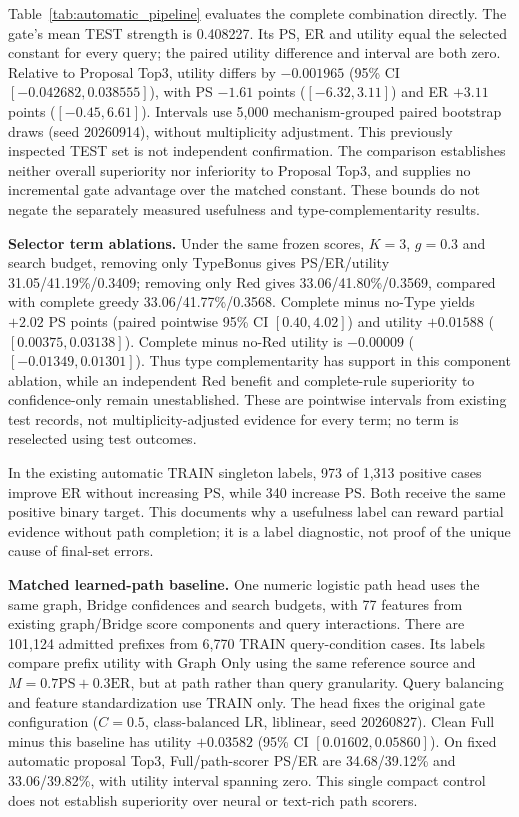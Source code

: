 \documentclass{article} %
\newcommand{\rev}[1]{{\color{blue}#1}}
\begin{document}
Table~\ref{tab:automatic_pipeline} evaluates the complete combination directly. \rev{The gate's mean TEST strength is 0.408227. Its PS, ER and utility equal the selected constant for every query; the paired utility difference and interval are both zero. Relative to Proposal Top3, utility differs by $-0.001965$ (95\% CI $[-0.042682,0.038555]$), with PS $-1.61$ points ($[-6.32,3.11]$) and ER $+3.11$ points ($[-0.45,6.61]$).} Intervals use 5,000 mechanism-grouped paired bootstrap draws (seed 20260914), without multiplicity adjustment. This previously inspected TEST set is not independent confirmation. \rev{The comparison establishes neither overall superiority nor inferiority to Proposal Top3, and supplies no incremental gate advantage over the matched constant. These bounds do not negate the separately measured usefulness and type-complementarity results.}

\noindent\textbf{Selector term ablations.} Under the same frozen scores, $K=3$, $g=0.3$ and search budget, removing only TypeBonus gives \rev{PS/ER/utility 31.05/41.19\%/0.3409}; removing only Red gives \rev{33.06/41.80\%/0.3569}, compared with complete greedy \rev{33.06/41.77\%/0.3568}. Complete minus no-Type yields \rev{$+2.02$ PS points (paired pointwise 95\% CI $[0.40,4.02]$) and utility $+0.01588$ ($[0.00375,0.03138]$)}. Complete minus no-Red utility is \rev{$-0.00009$ ($[-0.01349,0.01301]$)}. Thus \rev{type complementarity has support in this component ablation, while an independent Red benefit and complete-rule superiority to confidence-only remain unestablished}. These are pointwise intervals from existing test records, not multiplicity-adjusted evidence for every term; no term is reselected using test outcomes.

In the existing automatic TRAIN singleton labels, \rev{973 of 1,313 positive cases improve ER without increasing PS, while 340 increase PS}. Both receive the same positive binary target. This documents why a usefulness label can reward partial evidence without path completion; it is a label diagnostic, not proof of the unique cause of final-set errors.

\noindent\textbf{Matched learned-path baseline.} One numeric logistic path head uses the same graph, Bridge confidences and search budgets, with \rev{77 features} from existing graph/Bridge score components and query interactions. There are \rev{101,124 admitted prefixes from 6,770 TRAIN query-condition cases}. Its labels compare prefix utility with Graph Only using the same reference source and $M=0.7\mathrm{PS}+0.3\mathrm{ER}$, but at path rather than query granularity. Query balancing and feature standardization use TRAIN only. The head fixes the original gate configuration ($C=0.5$, class-balanced LR, liblinear, seed 20260827). \rev{Clean Full minus this baseline has utility $+0.03582$ (95\% CI $[0.01602,0.05860]$). On fixed automatic proposal Top3, Full/path-scorer PS/ER are 34.68/39.12\% and 33.06/39.82\%, with utility interval spanning zero.} This single compact control does not establish superiority over neural or text-rich path scorers.
\end{document}
